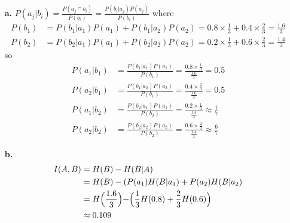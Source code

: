 \documentclass[11pt]{article}
\newcommand{\ds}{\displaystyle}
\begin{document}
\bigskip{}
\begin{itemize}
  \item[{\bf a.}]
    $\ds P(a_j|b_i) = \frac{P(a_j\cap b_i)}{P(b_i)}
                    = \frac{P(b_i|a_j)P(a_j)}{P(b_i)}$\quad
    where
    \begin{align*}
      P(b_1) &= P(b_1|a_1)P(a_1)+P(b_1|a_2)P(a_2)
              = 0.8\times \frac{1}{3} + 0.4\times \frac{2}{3}
              = \frac{1.6}{3}\\
      P(b_2) &= P(b_2|a_1)P(a_1)+P(b_2|a_2)P(a_2)
              = 0.2\times \frac{1}{3} + 0.6\times \frac{2}{3}
              = \frac{1.4}{3}
    \end{align*}
    so
    \begin{align*}
      P(a_1|b_1) &= \frac{P(b_1|a_1)P(a_1)}{P(b_1)}
                  = \frac{0.8\times \frac{1}{3}}{\frac{1.6}{3}}
                  = 0.5\\
      P(a_2|b_1) &= \frac{P(b_1|a_2)P(a_2)}{P(b_1)}
                  = \frac{0.4\times \frac{2}{3}}{\frac{1.6}{3}}
                  = 0.5\\
      P(a_1|b_2) &= \frac{P(b_2|a_1)P(a_1)}{P(b_2)}
                  = \frac{0.2\times \frac{1}{3}}{\frac{1.4}{3}}
                  \approx \frac{1}{7}\\
      P(a_2|b_2) &= \frac{P(b_2|a_2)P(a_2)}{P(b_2)}
                  = \frac{0.6\times \frac{2}{3}}{\frac{1.4}{3}}
                  \approx \frac{6}{7}
    \end{align*}
  \item[{\bf b.}]
    \begin{align*}
      I(A,B) &= H(B) - H(B|A)\\
             &= H(B) - (P(a_1)H(B|a_1) + P(a_2)H(B|a_2)\\
             &= H\Bigl(\frac{1.6}{3}\Bigl) 
              - \Bigl(\frac{1}{3}H(0.8) + \frac{2}{3}H(0.6)\Bigr)\\
             &\approx 0.109
    \end{align*}
\end{itemize}
\end{document}
